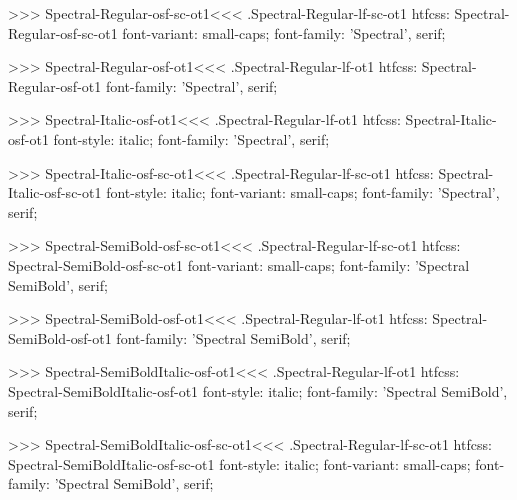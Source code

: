 >>>
\<Spectral-Regular-osf-sc-ot1\><<<
.Spectral-Regular-lf-sc-ot1
htfcss:  Spectral-Regular-osf-sc-ot1  font-variant: small-caps; font-family: 'Spectral', serif;

>>>
\<Spectral-Regular-osf-ot1\><<<
.Spectral-Regular-lf-ot1
htfcss:  Spectral-Regular-osf-ot1  font-family: 'Spectral', serif;

>>>
\<Spectral-Italic-osf-ot1\><<<
.Spectral-Regular-lf-ot1
htfcss:  Spectral-Italic-osf-ot1  font-style: italic; font-family: 'Spectral', serif;

>>>
\<Spectral-Italic-osf-sc-ot1\><<<
.Spectral-Regular-lf-sc-ot1
htfcss:  Spectral-Italic-osf-sc-ot1  font-style: italic; font-variant: small-caps; font-family: 'Spectral', serif;

>>>
\<Spectral-SemiBold-osf-sc-ot1\><<<
.Spectral-Regular-lf-sc-ot1
htfcss:  Spectral-SemiBold-osf-sc-ot1  font-variant: small-caps; font-family: 'Spectral SemiBold', serif;

>>>
\<Spectral-SemiBold-osf-ot1\><<<
.Spectral-Regular-lf-ot1
htfcss:  Spectral-SemiBold-osf-ot1  font-family: 'Spectral SemiBold', serif;

>>>
\<Spectral-SemiBoldItalic-osf-ot1\><<<
.Spectral-Regular-lf-ot1
htfcss:  Spectral-SemiBoldItalic-osf-ot1  font-style: italic; font-family: 'Spectral SemiBold', serif;

>>>
\<Spectral-SemiBoldItalic-osf-sc-ot1\><<<
.Spectral-Regular-lf-sc-ot1
htfcss:  Spectral-SemiBoldItalic-osf-sc-ot1  font-style: italic; font-variant: small-caps; font-family: 'Spectral SemiBold', serif;


